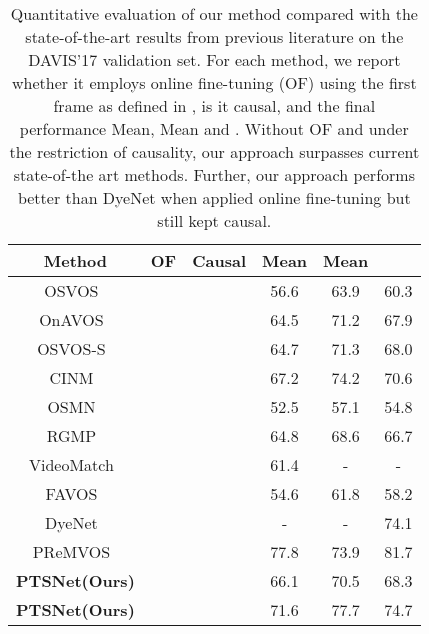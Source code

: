 \documentclass[10pt,twocolumn,letterpaper]{article}
\newcommand{\cmark}{\ding{51}}\newcommand{\xmark}{\ding{55}}
\begin{document}
    \begin{table}[b]
    \caption{Quantitative evaluation of our method compared with the state-of-the-art results from previous literature on the DAVIS'17 validation set. For each method, we report whether it employs online fine-tuning (OF) using the first frame as defined in \cite{osvos_cvpr17}, is it causal, and the final performance  Mean,  Mean and . Without OF and under the restriction of causality, our approach surpasses current state-of-the art methods. Further, our approach performs better than DyeNet when applied online fine-tuning but still kept causal.}
    \vspace{1mm}
      \centering
\setlength{\tabcolsep}{1.2mm}
      {\begin{tabular}{c | c c | c c c}
        \toprule
Method & OF & Causal &  Mean &  Mean &  \\
\midrule
        OSVOS~\cite{osvos_cvpr17}                 & \cmark & \cmark &      56.6     &       63.9       &        60.3 \\
        OnAVOS~\cite{onavos_bmvc17}               & \cmark & \cmark &      64.5     &       71.2       &        67.9 \\
        OSVOS-S~\cite{vos_wo_tempinfo_pami18}     & \cmark & \cmark &      64.7     &       71.3       &        68.0 \\
        CINM~\cite{cnn_in_mrf_cvpr18}             & \cmark & \cmark &      67.2     &       74.2       &        70.6 \\
        OSMN~\cite{Yang2018osmn}                  & \xmark & \cmark &      52.5     &       57.1       &        54.8 \\
        RGMP~\cite{rgmp_cvpr18}                   & \xmark & \cmark &      64.8     &       68.6       &        66.7 \\
        VideoMatch~\cite{videomatch_eccv18}       & \xmark & \cmark &      61.4     &       -          &        -    \\
        FAVOS~\cite{favos_cvpr18}                 & \xmark & \cmark &      54.6     &       61.8       &        58.2 \\
        DyeNet~\cite{dyenet_eccv18}               & \xmark & \xmark &      -        &       -          &        74.1 \\
        PReMVOS~\cite{prevmvos_accv18}            & \cmark & \xmark &      77.8     &       73.9       &        81.7 \\
\midrule
\textbf{PTSNet(Ours)}                     & \xmark & \cmark &      66.1     &       70.5       &        68.3 \\
        \textbf{PTSNet(Ours)}                     & \cmark & \cmark &      71.6     &       77.7       &        74.7 \\
        \bottomrule
      \end{tabular}}
      \label{table:davis17}
    \end{table}
\end{document}
